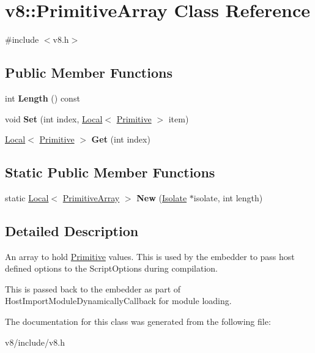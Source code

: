 \hypertarget{classv8_1_1PrimitiveArray}{}\section{v8\+:\+:Primitive\+Array Class Reference}
\label{classv8_1_1PrimitiveArray}


{\ttfamily \#include $<$v8.\+h$>$}

\subsection*{Public Member Functions}
\begin{DoxyCompactItemize}
\item 
\mbox{\label{classv8_1_1PrimitiveArray_a7e51b026e03b0a4ab3c3bec4676dfd9e}} 
int {\bfseries Length} () const
\item 
\mbox{\label{classv8_1_1PrimitiveArray_a58b7323d46f3a1e4de589bdc76f59511}} 
void {\bfseries Set} (int index, \mbox{\hyperlink{classv8_1_1Local}{Local}}$<$ \mbox{\hyperlink{classv8_1_1Primitive}{Primitive}} $>$ item)
\item 
\mbox{\label{classv8_1_1PrimitiveArray_a039d55a4b98b61944c291536345887d3}} 
\mbox{\hyperlink{classv8_1_1Local}{Local}}$<$ \mbox{\hyperlink{classv8_1_1Primitive}{Primitive}} $>$ {\bfseries Get} (int index)
\end{DoxyCompactItemize}
\subsection*{Static Public Member Functions}
\begin{DoxyCompactItemize}
\item 
\mbox{\label{classv8_1_1PrimitiveArray_afdb183e117929fa286e0311c51ff8693}} 
static \mbox{\hyperlink{classv8_1_1Local}{Local}}$<$ \mbox{\hyperlink{classv8_1_1PrimitiveArray}{Primitive\+Array}} $>$ {\bfseries New} (\mbox{\hyperlink{classv8_1_1Isolate}{Isolate}} $\ast$isolate, int length)
\end{DoxyCompactItemize}


\subsection{Detailed Description}
An array to hold \mbox{\hyperlink{classv8_1_1Primitive}{Primitive}} values. This is used by the embedder to pass host defined options to the Script\+Options during compilation.

This is passed back to the embedder as part of Host\+Import\+Module\+Dynamically\+Callback for module loading. 

The documentation for this class was generated from the following file\+:\begin{DoxyCompactItemize}
\item 
v8/include/v8.\+h\end{DoxyCompactItemize}
